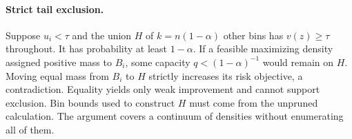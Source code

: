 \paragraph{Strict tail exclusion.}
Suppose $u_i<\tau$ and the union $H$ of $k=n(1-\alpha)$ other bins has $v(z)\geq\tau$ throughout. It has probability at least $1-\alpha$. If a feasible maximizing density assigned positive mass to $B_i$, some capacity $q<(1-\alpha)^{-1}$ would remain on $H$. Moving equal mass from $B_i$ to $H$ strictly increases its risk objective, a contradiction. Equality yields only weak improvement and cannot support exclusion. Bin bounds used to construct $H$ must come from the unpruned calculation. The argument covers a continuum of densities without enumerating all of them.

